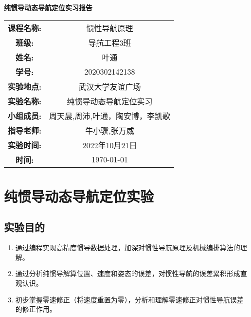 \documentclass{ctexart}
\begin{document}
\newpage
\thispagestyle{empty}
    \begin{center}
        \Huge\textbf{纯惯导动态导航定位实习报告}
    \end{center}
\vspace*{\fill}

\begin{table}[h]
    \centering
    \large
    \begin{tabular}{cc}
    \textbf{课程名称:} & 惯性导航原理 \\ \cline{2-2}
    \textbf{班级:} & 导航工程3班 \\ \cline{2-2}
    \textbf{姓名:} & 叶通 \\  \cline{2-2}
    \textbf{学号:} & 2020302142138 \\ \cline{2-2}
    \textbf{实验地点:}&武汉大学友谊广场 \\ \cline{2-2}
    \textbf{实验名称:}&纯惯导动态导航定位实习\\ \cline{2-2}
    \textbf{小组成员:}&周天晨,周沛,叶通，陶安博，李凯歌\\ \cline{2-2}
    \textbf{指导老师:}&牛小骥,张万威\\ \cline{2-2}
    \textbf{实验时间:}&2022年10月21日\\ \cline{2-2}
    \textbf{时间:} & \today \\ \cline{2-2}
    \end{tabular}
\end{table}

\newpage
{}
\setcounter{page}{1}
\tableofcontents

\newpage
\setcounter{page}{1}

\section{纯惯导动态导航定位实验}
\subsection{实验目的}
\begin{enumerate}[(1)]
\item 通过编程实现高精度惯导数据处理，加深对惯性导航原理及机械编排算法的理解。
\item 通过分析纯惯导解算位置、速度和姿态的误差，对惯性导航的误差累积形成直观认识。
\item 初步掌握零速修正（将速度重置为零），分析和理解零速修正对惯性导航误差的修正作用。
\end{enumerate}
\end{document}
